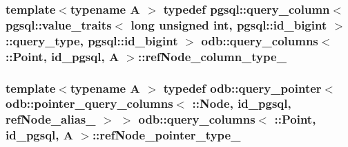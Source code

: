 \subsubsection[{ref\+Node\+\_\+column\+\_\+type\+\_\+}]{\setlength{\rightskip}{0pt plus 5cm}template$<$typename A $>$ typedef pgsql\+::query\+\_\+column$<$ pgsql\+::value\+\_\+traits$<$ long unsigned int, pgsql\+::id\+\_\+bigint $>$\+::query\+\_\+type, pgsql\+::id\+\_\+bigint $>$ odb\+::query\+\_\+columns$<$ \+::{\bf Point}, id\+\_\+pgsql, A $>$\+::{\bf ref\+Node\+\_\+column\+\_\+type\+\_\+}}\label{structodb_1_1query__columns_3_01_1_1_point_00_01id__pgsql_00_01_a_01_4_a6129668a657849ef92aad6ed6735262c}
\hypertarget{structodb_1_1query__columns_3_01_1_1_point_00_01id__pgsql_00_01_a_01_4_a4a11b6d519a7123063c4544cb53fd03f}{}
\subsubsection[{ref\+Node\+\_\+pointer\+\_\+type\+\_\+}]{\setlength{\rightskip}{0pt plus 5cm}template$<$typename A $>$ typedef odb\+::query\+\_\+pointer$<$ odb\+::pointer\+\_\+query\+\_\+columns$<$ \+::{\bf Node}, id\+\_\+pgsql, {\bf ref\+Node\+\_\+alias\+\_\+} $>$ $>$ odb\+::query\+\_\+columns$<$ \+::{\bf Point}, id\+\_\+pgsql, A $>$\+::{\bf ref\+Node\+\_\+pointer\+\_\+type\+\_\+}}\label{structodb_1_1query__columns_3_01_1_1_point_00_01id__pgsql_00_01_a_01_4_a4a11b6d519a7123063c4544cb53fd03f}
\hypertarget{structodb_1_1query__columns_3_01_1_1_point_00_01id__pgsql_00_01_a_01_4_a2410ebc7698f7395087c9cf262e74e67}{}
